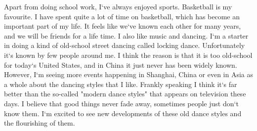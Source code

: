 \documentclass[paper=letter, fontsize=11pt]{scrartcl}
\numberwithin{equation}{section}		%
\numberwithin{figure}{section}			%
\numberwithin{table}{section}			%
\begin{document}
Apart from doing school work, I`ve always enjoyed sports. Basketball is my favourite. I have spent quite a lot of time on basketball, which has become an important part of my life. It feels like we`ve known each other for many years, and we will be friends for a life time. I also like music and dancing. I`m a starter in doing a kind of old-school street dancing called locking dance. Unfortunately it`s known by few people around me. I think the reason is that it is too old-school for today`s United States, and in China it just never has been widely known. However, I`m seeing more events happening in Shanghai, China or even in Asia as a whole about the dancing styles that I like. Frankly speaking I think it`s far better than the so-called "modern dance styles" that appears on television these days. I believe that good things never fade away, sometimes people just don`t know them. I`m excited to see new developments of these old dance styles and the flourishing of them.
\pagebreak
\end{document}
